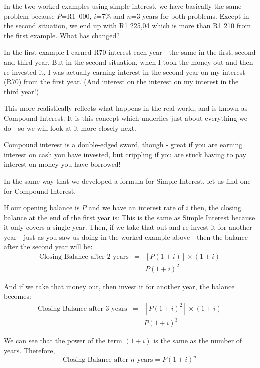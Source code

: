 \documentclass[10pt,a4paper,titlepage,twoside,openright]{report}
\begin{document}
In the two worked examples using simple interest, we have basically the same problem because $P$=R1~000, $i$=7\% and $n$=3 years for both problems. Except in the second situation, we end up with R1 225,04 which is more than R1 210 from the first example. What has changed?

In the first example I earned R70 interest each year - the same in the first, second and third year. But in the second situation, when I took the money out and then re-invested it, I was actually earning interest in the second year on my interest (R70) from the first year. (And interest on the interest on my interest in the third year!)

This more realistically reflects what happens in the real world, and is known as Compound Interest. It is this concept which underlies just about everything we do - so we will look at it more closely next.


Compound interest is a double-edged sword, though - great if you are earning interest on cash you have invested, but crippling if you are stuck having to pay interest on money you have borrowed!

In the same way that we developed a formula for Simple Interest, let us find one for Compound Interest.

If our opening balance is $P$ and we have an interest rate of $i$ then, the closing balance at the end of the first year is:
This is the same as Simple Interest because it only covers a single year. Then, if we take that out and re-invest it for another year - just as you saw us doing in the worked example above - then the balance after the second year will be:
\begin{eqnarray*}
\mbox{Closing Balance after 2 years}&=& [P(1+i)] \times (1+i)\\
&=& P (1+i)^2
\end{eqnarray*}

And if we take that money out, then invest it for another year, the balance becomes:
\begin{eqnarray*}
\mbox{Closing Balance after 3 years}&=& [P(1+i)^2] \times (1+i)\\
&=& P (1+i)^3
\end{eqnarray*}

We can see that the power of the term $(1+i)$ is the same as the number of years. Therefore, 
\begin{equation}
\label{eq:compound}
\mbox{Closing Balance after $n$ years}=P (1+i)^n
\end{equation}
\end{document}
